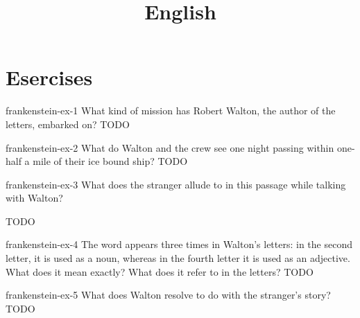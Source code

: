 \documentclass[preview]{standalone}
\begin{document}
\title{English}
\genpage

\section{Esercises}

\begin{snippetexercise}{frankenstein-ex-1}
    {What kind of mission has Robert Walton, the author of the letters, embarked on?}
    TODO
\end{snippetexercise}

\begin{snippetexercise}{frankenstein-ex-2}
    {What do Walton and the crew see one night passing within one-half a mile of their ice bound
    ship?}
    TODO
\end{snippetexercise}

\begin{snippetexercise}{frankenstein-ex-3}
    {What does the stranger allude to in this passage while talking with Walton?}
    \begin{center}
    \end{center}
    TODO
\end{snippetexercise}

\begin{snippetexercise}{frankenstein-ex-4}
    {The word  appears three times in Walton's letters: in the second letter, it is used as
    a noun, whereas in the fourth letter it is used as an adjective. What does it mean exactly? What
    does it refer to in the letters?}
    TODO
\end{snippetexercise}

\begin{snippetexercise}{frankenstein-ex-5}
    {What does Walton resolve to do with the stranger's story?}
    TODO
\end{snippetexercise}
\end{document}
